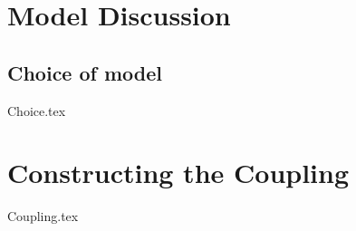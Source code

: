 \chapter{Model Discussion}\label{ch:modelDis}

\section{Choice of model}
{Choice.tex}

\newpage
\chapter{Constructing the Coupling}
{Coupling.tex}